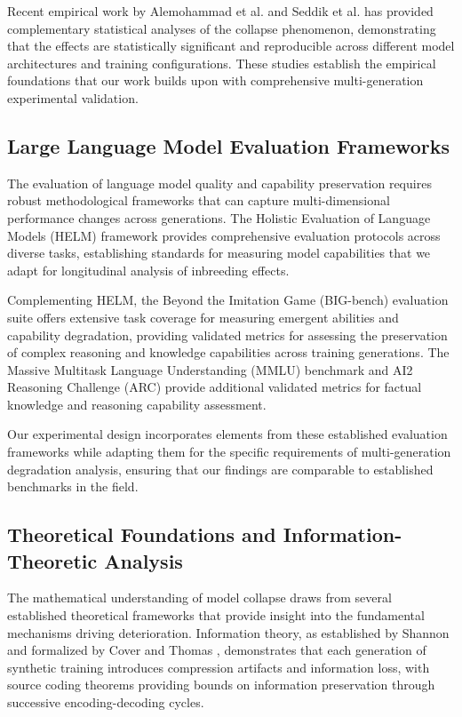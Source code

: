 \documentclass{article}
\begin{document}
Recent empirical work by Alemohammad et al. \cite{alemohammad2023self} and Seddik et al. \cite{seddik2024bad} has provided complementary statistical analyses of the collapse phenomenon, demonstrating that the effects are statistically significant and reproducible across different model architectures and training configurations. These studies establish the empirical foundations that our work builds upon with comprehensive multi-generation experimental validation.

\subsection{Large Language Model Evaluation Frameworks}

The evaluation of language model quality and capability preservation requires robust methodological frameworks that can capture multi-dimensional performance changes across generations. The Holistic Evaluation of Language Models (HELM) framework \cite{liang2022holistic} provides comprehensive evaluation protocols across diverse tasks, establishing standards for measuring model capabilities that we adapt for longitudinal analysis of inbreeding effects.

Complementing HELM, the Beyond the Imitation Game (BIG-bench) evaluation suite \cite{srivastava2022beyond} offers extensive task coverage for measuring emergent abilities and capability degradation, providing validated metrics for assessing the preservation of complex reasoning and knowledge capabilities across training generations. The Massive Multitask Language Understanding (MMLU) benchmark \cite{hendrycks2020measuring} and AI2 Reasoning Challenge (ARC) \cite{clark2018think} provide additional validated metrics for factual knowledge and reasoning capability assessment.

Our experimental design incorporates elements from these established evaluation frameworks while adapting them for the specific requirements of multi-generation degradation analysis, ensuring that our findings are comparable to established benchmarks in the field.

\subsection{Theoretical Foundations and Information-Theoretic Analysis}

The mathematical understanding of model collapse draws from several established theoretical frameworks that provide insight into the fundamental mechanisms driving deterioration. Information theory, as established by Shannon \cite{shannon1948mathematical} and formalized by Cover and Thomas \cite{cover1999elements}, demonstrates that each generation of synthetic training introduces compression artifacts and information loss, with source coding theorems providing bounds on information preservation through successive encoding-decoding cycles.
\end{document}
